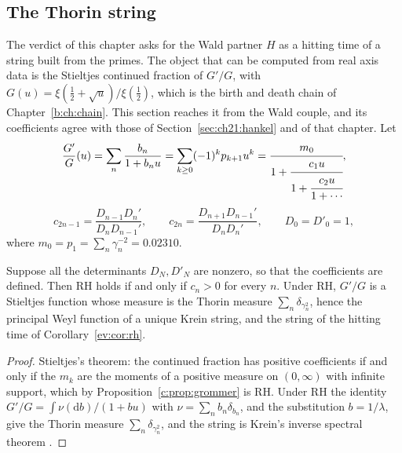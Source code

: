\subsection{The Thorin string}\label{c:sec:string}

The verdict of this chapter asks for the Wald partner $H$ as a hitting time of a string built from the primes. The object that can be computed from real axis data is the Stieltjes continued fraction of $G'/G$, with $G(u)=\xi(\frac12+\sqrt u)/\xi(\frac12)$, which is the birth and death chain of Chapter~\ref{b:ch:chain}. This section reaches it from the Wald couple, and its coefficients agree with those of Section~\ref{sec:ch21:hankel} and of that chapter. Let
\[
\frac{G'}G(u)=\sum_n\frac{b_n}{1+b_nu}=\sum_{k\ge0}(-1)^kp_{k+1}u^k=\cfrac{m_0}{1+\cfrac{c_1u}{1+\cfrac{c_2u}{1+\cdots}}},
\]
\[
c_{2n-1}=\frac{D_{n-1}D_n'}{D_nD_{n-1}'},\qquad c_{2n}=\frac{D_{n+1}D_{n-1}'}{D_nD_n'},\qquad D_0=D'_0=1,
\]
where $m_0=p_1=\sum_n\gamma_n^{-2}=0.02310$.

\begin{proposition}\label{c:prop:string}
Suppose all the determinants $D_N,D'_N$ are nonzero, so that the coefficients are defined. Then RH holds if and only if $c_n>0$ for every $n$. Under RH, $G'/G$ is a Stieltjes function whose measure is the Thorin measure $\sum_n\delta_{\gamma_n^2}$, hence the principal Weyl function of a unique Krein string, and the string of the hitting time of Corollary~\ref{ev:cor:rh}.
\end{proposition}

\begin{proof}
Stieltjes's theorem: the continued fraction has positive coefficients if and only if the $m_k$ are the moments of a positive measure on $(0,\infty)$ with infinite support, which by Proposition~\ref{c:prop:grommer} is RH. Under RH the identity $G'/G=\int\nu(\mathrm db)/(1+bu)$ with $\nu=\sum_nb_n\delta_{b_n}$, and the substitution $b=1/\lambda$, give the Thorin measure $\sum_n\delta_{\gamma_n^2}$, and the string is Krein's inverse spectral theorem \cite{KacKrein74}.
\end{proof}

